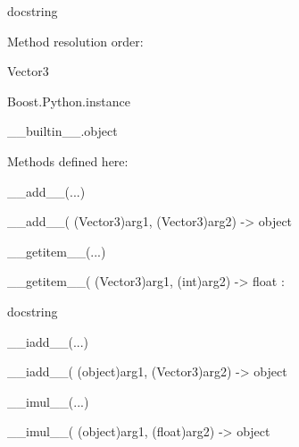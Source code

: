 \documentclass[letterpaper,10pt,english]{sphinxmanual}
\begin{document}
\begin{description}
\begin{description}
\item[{class Vector3(Boost.Python.instance)}] \leavevmode
\begin{DUlineblock}{0em}
\item[] docstring
\item[] 
\item[] Method resolution order:
\item[]
\begin{DUlineblock}{\DUlineblockindent}
\item[] Vector3
\item[] Boost.Python.instance
\item[] \_\_builtin\_\_.object
\item[] 
\end{DUlineblock}
\item[] Methods defined here:
\item[] 
\item[] \_\_add\_\_(...)
\item[]
\begin{DUlineblock}{\DUlineblockindent}
\item[] \_\_add\_\_( (Vector3)arg1, (Vector3)arg2) -\textgreater{} object
\item[] 
\end{DUlineblock}
\item[] \_\_getitem\_\_(...)
\item[]
\begin{DUlineblock}{\DUlineblockindent}
\item[] \_\_getitem\_\_( (Vector3)arg1, (int)arg2) -\textgreater{} float :
\item[]
\begin{DUlineblock}{\DUlineblockindent}
\item[] docstring
\item[] 
\end{DUlineblock}
\end{DUlineblock}
\item[] \_\_iadd\_\_(...)
\item[]
\begin{DUlineblock}{\DUlineblockindent}
\item[] \_\_iadd\_\_( (object)arg1, (Vector3)arg2) -\textgreater{} object
\item[] 
\end{DUlineblock}
\item[] \_\_imul\_\_(...)
\item[]
\begin{DUlineblock}{\DUlineblockindent}
\item[] \_\_imul\_\_( (object)arg1, (float)arg2) -\textgreater{} object

\end{DUlineblock}
\end{DUlineblock}
\end{description}
\end{description}
\end{document}
